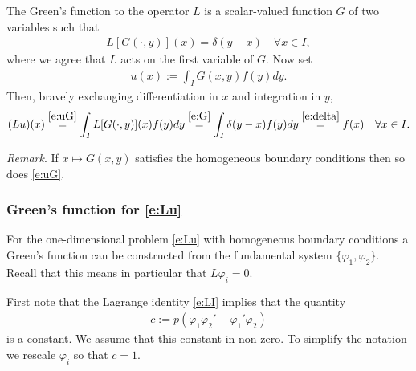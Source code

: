 \documentclass[12pt,a4paper]{article}
\begin{document}
    
    The Green's function to the operator $L$ 
    is a scalar-valued function $G$ of two variables
    such that
    \begin{align}
        \label{e:G}
        L [ G(\cdot, y) ](x)
        =
        \delta(y - x)
        \quad
        \forall x \in I
        ,
    \end{align}
    where we agree that $L$ acts on the first variable of $G$.
    Now set
    \begin{align}
        \label{e:uG}
        u(x) := \int_I G(x, y) f(y) dy
        .
    \end{align}
    Then, bravely exchanging differentiation in $x$ and integration in $y$,
    \begin{align}
        (L u)(x)
        \stackrel{\eqref{e:uG}}{=}
        \int_I L[ G(\cdot, y) ](x) f(y) dy
        \stackrel{\eqref{e:G}}{=}
        \int_I \delta(y - x) f(y) dy
        \stackrel{\eqref{e:delta}}{=}
        f(x)
        \quad
        \forall x \in I
        .
    \end{align}

    
    \emph{Remark}.
    If $x \mapsto G(x, y)$ satisfies
    the homogeneous boundary conditions
    then so does \eqref{e:uG}.
    
    
    \subsubsection*{Green's function for \eqref{e:Lu}}
    
    For the one-dimensional problem \eqref{e:Lu}
    with homogeneous boundary conditions
    a Green's function can be constructed
    from the fundamental system $\{ \varphi_1, \varphi_2 \}$.
    Recall that this means in particular that $L \varphi_i = 0$.
    
    
    First note that
    the Lagrange identity \eqref{e:LI}
    implies that the quantity
    \begin{align}
        c := p (\varphi_1 \varphi_2' - \varphi_1' \varphi_2)
    \end{align}
    is a constant.
    We assume that this constant in non-zero.
    To simplify the notation
    we rescale $\varphi_i$ so that $c = 1$.
\end{document}
